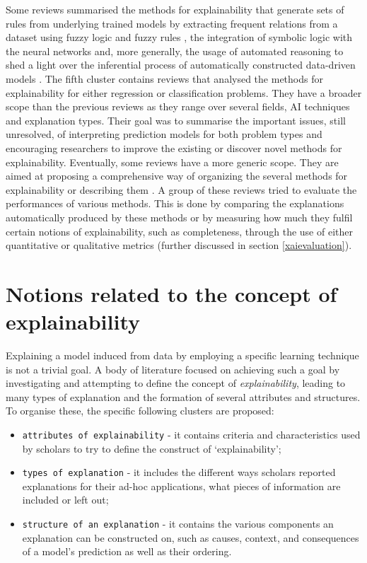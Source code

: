\documentclass[final,1p,times]{elsarticle}
\begin{document}
Some reviews summarised the methods for explainability that generate sets of rules from underlying trained models \cite{hailesilassie2016rule} by extracting frequent relations from a dataset using fuzzy logic and fuzzy rules \cite{fernandez2019evolutionary, guillaume2001designing, lisboa2013interpretability}, the integration of symbolic logic with the neural networks \cite{besold2015towards, garcez2015neural} and, more generally, the usage of automated reasoning to shed a light over the inferential process of automatically constructed data-driven models \cite{bonacina2017automated}.
The fifth cluster contains reviews that analysed the methods for explainability for either regression \cite{otte2013safe} or classification \cite{backhaus2014classification, freitas2010importance,martens2011performance} problems. They have a broader scope than the previous reviews as they range over several fields, AI techniques and explanation types. Their goal was to summarise the important issues, still unresolved, of interpreting prediction models for both problem types and encouraging researchers to improve the existing or discover novel methods for explainability.
Eventually, some reviews have a more generic scope. They are aimed at proposing a comprehensive way of organizing the several methods for explainability \cite{adadi2018peeking, biran2017explanation, guidotti2018survey} or describing them \cite{biran2017explanation, gade2019explainable, xu2019explainable}. A group of these reviews tried to evaluate the performances of various methods. This is done by comparing the explanations automatically produced by these methods \cite{martens2007comprehensible} or by measuring how much they fulfil certain notions of explainability, such as completeness, through the use of either quantitative or qualitative metrics\cite{cui2019integrative} (further discussed in section \ref{xaievaluation}). 

\section{Notions related to the concept of explainability}\label{notions}
Explaining a model induced from data by employing a specific learning technique is not a trivial goal. A body of literature focused on achieving such a goal by investigating and attempting to define the concept of \textit{explainability}, leading to many types of explanation and the formation of several attributes and structures. To organise these, the specific following clusters are proposed:
\begin{itemize}
\item {\verb|attributes of explainability|} - it contains criteria and characteristics used by scholars to try to define the construct of `explainability';
\item {\verb|types of explanation|} - it includes the different ways scholars reported explanations for their ad-hoc applications, what pieces of information are included or left out;
\item {\verb|structure of an explanation|} - it contains the various components an explanation can be constructed on, such as causes, context, and consequences of a model's prediction as well as their ordering.
\end{itemize}
\end{document}
